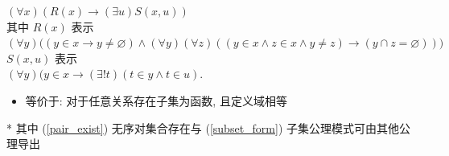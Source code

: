 \documentclass[11pt,a4paper,twocolumn,fleqn]{article} %
\renewcommand{\emptyset}{\varnothing}
\begin{document}
\begin{enumerate}
	$(\forall x) (R(x) \to (\exists u) S(x,u))$\\
	其中 $R(x)$ 表示\\
	$(\forall y)\big((y\in x \to y \neq \emptyset)\land (\forall y)(\forall z)
	((y\in x\land z\in x \land y\neq z)\to (y\cap z=\emptyset))\big)$\\
	$S(x,u)$ 表示\\
	$(\forall y)(y\in x \to (\exists !t)(t\in y \land t \in u)$.\\
	\begin{itemize}
		\item 等价于: 对于任意关系存在子集为函数, 且定义域相等
	\end{itemize}
\end{enumerate}
* 其中 (\ref{pair_exist}) 无序对集合存在与 (\ref{subset_form}) 
子集公理模式可由其他公理导出
\end{document}
